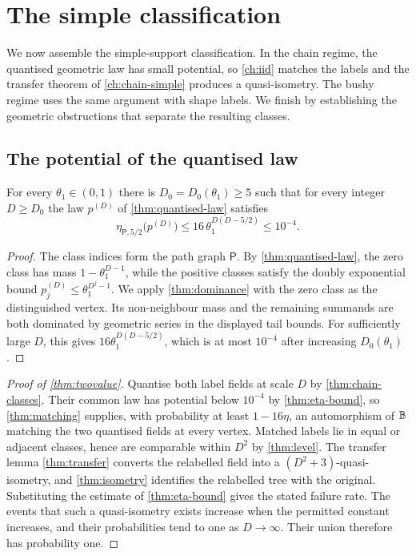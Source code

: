 \chapter{The simple classification}
\label{ch:gw-simple}

We now assemble the simple-support classification. In the chain regime, the quantised geometric
law has small potential, so \cref{ch:iid} matches the labels and the transfer theorem of
\cref{ch:chain-simple} produces a quasi-isometry. The bushy regime uses the same argument with
shape labels. We finish by establishing the geometric obstructions that separate the resulting
classes.

\section{The potential of the quantised law}

\begin{lemma}
\label{thm:eta-bound}
\leanok
{}
For every $\theta_1\in(0,1)$ there is $D_0=D_0(\theta_1)\geq5$ such that for every integer
$D\geq D_0$ the law $p^{(D)}$ of \cref{thm:quantised-law} satisfies
\[
 \eta_{\mathsf P,5/2}\bigl(p^{(D)}\bigr)\leq16\,\theta_1^{D(D-5/2)}\leq10^{-4}.
\]
\end{lemma}

\begin{proof}
\leanok
{}
The class indices form the path graph $\mathsf P$. By \cref{thm:quantised-law}, the zero class
has mass $1-\theta_1^{D-1}$, while the positive classes satisfy the doubly exponential bound
$p_j^{(D)}\leq\theta_1^{D^j-1}$. We apply \cref{thm:dominance} with the zero class as the
distinguished vertex. Its non-neighbour mass and the remaining summands are both dominated by
geometric series in the displayed tail bounds. For sufficiently large $D$, this gives
$16\theta_1^{D(D-5/2)}$, which is at most $10^{-4}$ after increasing $D_0(\theta_1)$.
\end{proof}

\begin{proof}[Proof of \cref{thm:twovalue}]
\leanok
{}
Quantise both label fields at scale $D$ by \cref{thm:chain-classes}. Their common law has
potential below $10^{-4}$ by \cref{thm:eta-bound}, so \cref{thm:matching} supplies, with
probability at least $1-16\eta$, an automorphism of $\mathbb{B}$ matching the two quantised fields at
every vertex. Matched labels lie in equal or adjacent classes, hence are comparable within
$D^2$ by \cref{thm:level}. The transfer lemma \cref{thm:transfer} converts the relabelled field
into a $(D^2+3)$-quasi-isometry, and \cref{thm:isometry} identifies the relabelled tree with
the original. Substituting the estimate of \cref{thm:eta-bound} gives the stated failure rate.
The events that such a quasi-isometry exists increase when the permitted constant increases, and
their probabilities tend to one as $D\to\infty$. Their union therefore has probability one.
\end{proof}

